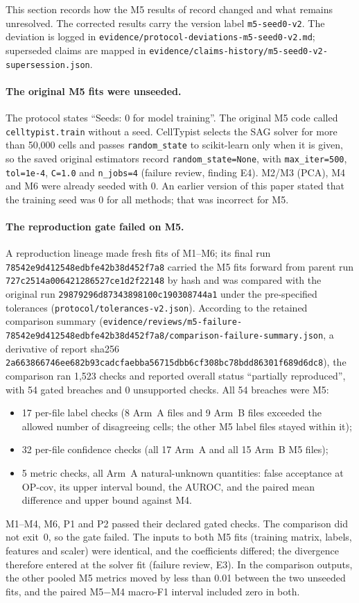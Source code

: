 \documentclass[11pt]{article}
\newcommand{\origrunid}{\nolinkurl{29879296d87343898100c190308744a1}}
\newcommand{\failrunid}{\nolinkurl{78542e9d412548edbfe42b38d452f7a8}}
\newcommand{\code}[1]{\texttt{#1}}
\begin{document}
This section records how the M5 results of record changed and what remains unresolved. The corrected results carry the version label \code{m5-seed0-v2}. The deviation is logged in \nolinkurl{evidence/protocol-deviations-m5-seed0-v2.md}; superseded claims are mapped in \nolinkurl{evidence/claims-history/m5-seed0-v2-supersession.json}.

\paragraph{The original M5 fits were unseeded.} The protocol states ``Seeds: 0 for model training''. The original M5 code called \code{celltypist.train} without a seed. CellTypist selects the SAG solver for more than 50{,}000 cells and passes \code{random\_state} to scikit-learn only when it is given, so the saved original estimators record \code{random\_state=None}, with \code{max\_iter=500}, \code{tol=1e-4}, \code{C=1.0} and \code{n\_jobs=4} (failure review, finding E4). M2/M3 (PCA), M4 and M6 were already seeded with 0. An earlier version of this paper stated that the training seed was 0 for all methods; that was incorrect for M5.

\paragraph{The reproduction gate failed on M5.} A reproduction lineage made fresh fits of M1--M6; its final run \failrunid{} carried the M5 fits forward from parent run \nolinkurl{727c2514a006421286527ce1d2f22148} by hash and was compared with the original run \origrunid{} under the pre-specified tolerances (\nolinkurl{protocol/tolerances-v2.json}). According to the retained comparison summary (\nolinkurl{evidence/reviews/m5-failure-78542e9d412548edbfe42b38d452f7a8/comparison-failure-summary.json}, a derivative of report sha256 \nolinkurl{2a663866746ee682b93cadcfaebba56715dbb6cf308bc78bdd86301f689d6dc8}), the comparison ran 1{,}523 checks and reported overall status ``partially reproduced'', with 54 gated breaches and 0 unsupported checks. All 54 breaches were M5:
\begin{itemize}
\item 17 per-file label checks (8 Arm~A files and 9 Arm~B files exceeded the allowed number of disagreeing cells; the other M5 label files stayed within it);
\item 32 per-file confidence checks (all 17 Arm~A and all 15 Arm~B M5 files);
\item 5 metric checks, all Arm~A natural-unknown quantities: false acceptance at OP-cov, its upper interval bound, the AUROC, and the paired mean difference and upper bound against M4.
\end{itemize}
M1--M4, M6, P1 and P2 passed their declared gated checks. The comparison did not exit~0, so the gate failed. The inputs to both M5 fits (training matrix, labels, features and scaler) were identical, and the coefficients differed; the divergence therefore entered at the solver fit (failure review, E3). In the comparison outputs, the other pooled M5 metrics moved by less than 0.01 between the two unseeded fits, and the paired M5$-$M4 macro-F1 interval included zero in both.
\end{document}
